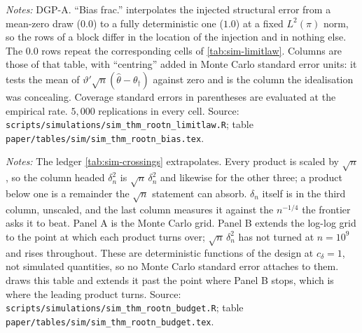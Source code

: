 \documentclass[
  12pt]{article}
\newcommand{\1}[1]{\mathds{1}\left[#1\right]}
\theoremstyle{plain}
\theoremstyle{definition}
\theoremstyle{definition}
\theoremstyle{remark}
\begin{document}
\begin{table}[!htbp]
\centering
\begin{threeparttable}
\caption{The mean-zero injection of the structural error, relaxed}
\label{tab:supp-bias}
\footnotesize

\begin{tablenotes}\footnotesize
\item \textit{Notes:} DGP-A. ``Bias frac.'' interpolates the injected structural
error from a mean-zero draw ($0.0$) to a fully deterministic one ($1.0$) at a
fixed $L^{2}(\pi)$ norm, so the rows of a block differ in the location of the
injection and in nothing else. The $0.0$ rows repeat the corresponding cells of
\cref{tab:sim-limitlaw}. Columns are those of that table, with ``centring''
added in Monte Carlo standard error units: it tests the mean of
$\vartheta'\sqrt n(\hat\theta-\theta_\dagger)$ against zero and is the column the
idealisation was concealing. Coverage standard errors in parentheses are
evaluated at the empirical rate. $5{,}000$ replications in every cell. Source:
\texttt{scripts/simulations/sim\_thm\_rootn\_limitlaw.R}; table
\texttt{paper/tables/sim/sim\_thm\_rootn\_bias.tex}.
\end{tablenotes}
\end{threeparttable}
\end{table}

\begin{table}[!htbp]
\centering
\begin{threeparttable}
\caption{The four Step-4 products of the remainder accounting}
\label{tab:supp-budget}
\footnotesize

\begin{tablenotes}\footnotesize
\item \textit{Notes:} The ledger \cref{tab:sim-crossings} extrapolates. Every
product is scaled by $\sqrt n$, so the column headed $\delta_n^{2}$ is
$\sqrt n\,\delta_n^{2}$ and likewise for the other three; a product below one is
a remainder the $\sqrt n$ statement can absorb. $\delta_n$ itself is in the third
column, unscaled, and the last column measures it against the $n^{-1/4}$ the
frontier asks it to beat. Panel A is the Monte Carlo grid. Panel B extends the
log-log grid to the point at which each product turns over; $\sqrt n\,\delta_n^2$
has not turned at $n=10^{9}$ and rises throughout. These are deterministic
functions of the design at $c_\delta=1$, not simulated quantities, so no Monte
Carlo standard error attaches to them.  draws this table
and extends it past the point where Panel B stops, which is where the leading
product turns. Source:
\texttt{scripts/simulations/sim\_thm\_rootn\_budget.R}; table
\texttt{paper/tables/sim/sim\_thm\_rootn\_budget.tex}.
\end{tablenotes}
\end{threeparttable}
\end{table}
\end{document}
